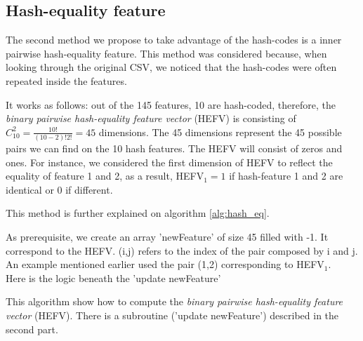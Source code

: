 		\subsection{Hash-equality feature}
			The second method we propose to take advantage of the hash-codes is a inner pairwise hash-equality feature. This method was considered because, when looking through the original CSV, we noticed that the hash-codes were often repeated inside the features. 

			It works as follows: out of the 145 features, 10 are hash-coded, therefore, the \textit{binary pairwise hash-equality feature vector} (HEFV) is consisting of $C_{10}^2 = \frac{10!}{(10-2)! 2!} = 45$ dimensions. The 45 dimensions represent the 45 possible pairs we can find on the 10 hash features. The HEFV will consist of zeros and ones. For instance, we considered the first dimension of HEFV to reflect the equality of feature 1 and 2, as a result, HEFV$_1 = 1$ if hash-feature 1 and 2 are identical or 0 if different.

			This method is further explained on algorithm \ref{alg:hash_eq}.


			\begin{algorithm}[H]
				As prerequisite, we create an array 'newFeature' of size 45 filled with -1. It correspond to the HEFV. (i,j) refers to the index of the pair composed by i and j. An example mentioned earlier used the pair (1,2) corresponding to HEFV$_1$. \\
				Here is the logic beneath the 'update newFeature'\\

				\caption{This algorithm show how to compute the \textit{binary pairwise hash-equality feature vector} (HEFV). There is a subroutine ('update newFeature') described in the second part.  }
				\label{alg:hash_eq}
			\end{algorithm}


